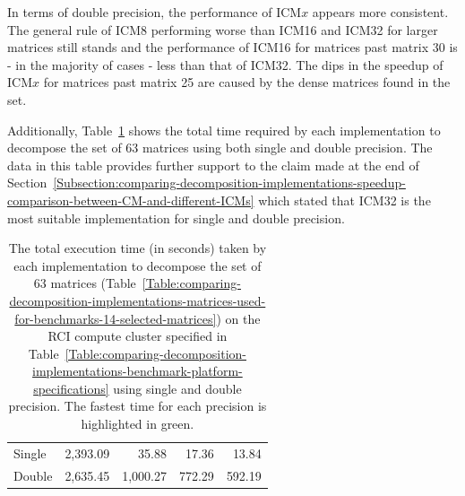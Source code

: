 \par In terms of double precision, the performance of ICM$ x $ appears more consistent. The general rule of ICM8 performing worse than ICM16 and ICM32 for larger matrices still stands and the performance of ICM16 for matrices past matrix 30 is - in the majority of cases - less than that of ICM32. The dips in the speedup of ICM$ x $ for matrices past matrix 25 are caused by the dense matrices found in the set.

Additionally, Table~\ref{Table:comparing-decomposition-implementations-performance-of-implementations-across-all-matrices-total-execution-time-single-double-precision} shows the total time required by each implementation to decompose the set of 63 matrices using both single and double precision. The data in this table provides further support to the claim made at the end of Section~\ref{Subsection:comparing-decomposition-implementations-speedup-comparison-between-CM-and-different-ICMs} which stated that ICM32 is the most suitable implementation for single and double precision.

\begin{table}[ht!]
	\centering
	\renewcommand{\arraystretch}{1.5}
	\begin{tabular}{|>{\footnotesize}l|>{\raggedleft\arraybackslash\footnotesize}r|>{\raggedleft\arraybackslash\footnotesize}r|>{\raggedleft\arraybackslash\footnotesize}r|>{\raggedleft\arraybackslash\footnotesize}r|}
		\hline
		\multicolumn{1}{|>{\centering\footnotesize}c|}{Precision} & \multicolumn{1}{>{\centering\footnotesize}c|}{CM} & \multicolumn{1}{>{\centering\footnotesize}c|}{ICM8} & \multicolumn{1}{>{\centering\footnotesize}c|}{ICM16} & \multicolumn{1}{>{\centering\footnotesize}c|}{ICM32} \\ \hline
		Single        & 2,393.09 &    35.88 &  17.36 & \cellcolor{green!25} 13.84 \\
		Double 		  & 2,635.45 & 1,000.27 & 772.29 & \cellcolor{green!25}592.19 \\ \hline
	\end{tabular}
	\caption{The total execution time (in seconds) taken by each implementation to decompose the set of 63 matrices (Table~\ref{Table:comparing-decomposition-implementations-matrices-used-for-benchmarks-14-selected-matrices}) on the RCI compute cluster specified in Table~\ref{Table:comparing-decomposition-implementations-benchmark-platform-specifications} using single and double precision. The fastest time for each precision is highlighted in green.}
	\label{Table:comparing-decomposition-implementations-performance-of-implementations-across-all-matrices-total-execution-time-single-double-precision}
\end{table}

